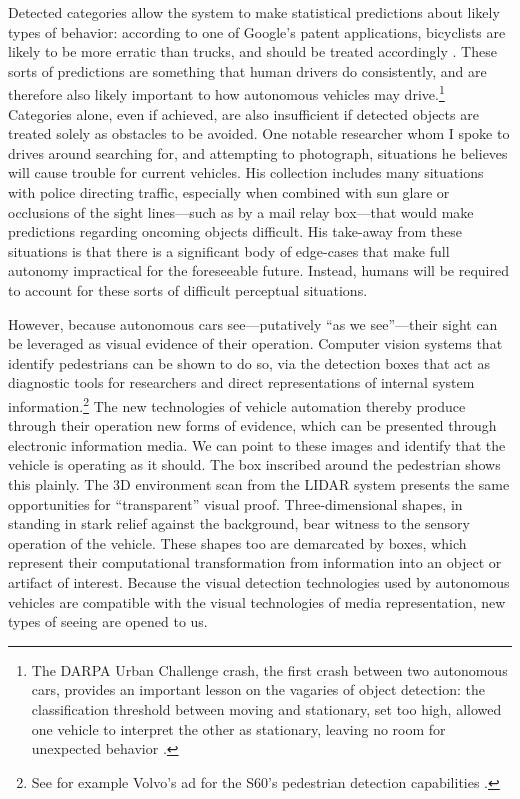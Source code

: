 Detected categories allow the system to make
statistical predictions about likely types of behavior: according to
one of Google's patent applications, bicyclists are likely to be more
erratic than trucks, and should be treated
accordingly \cite{predictPatent}. These sorts of predictions are
something that human drivers do consistently, and are therefore also
likely important to how autonomous vehicles may drive.\footnote{The
  DARPA Urban Challenge crash, the first crash between two autonomous
  cars, provides an important lesson on the vagaries of object
  detection: the classification threshold between moving and
  stationary, set too high, allowed one vehicle to interpret the other
  as stationary, leaving no room for unexpected behavior \cite{collisionPaper}.}
Categories alone, even if achieved, are also insufficient if detected
objects are treated solely as obstacles to be avoided. One notable
researcher whom I spoke to drives around searching 
for, and attempting to photograph, situations he believes will cause
trouble for current vehicles. His collection includes many situations with police
directing traffic, especially when combined with sun glare or
occlusions of the sight lines---such as by a mail relay box---that
would make predictions regarding oncoming 
objects difficult. His take-away from these situations is that there
is a significant body of edge-cases that make full autonomy
impractical for the foreseeable future. Instead, humans will be
required to account for these sorts of difficult perceptual situations. 


However, because autonomous cars see---putatively ``as we see''---their sight can
be leveraged as visual evidence of their operation. Computer vision
systems that identify 
pedestrians can be shown to do so, via the detection boxes that act as
diagnostic tools for researchers and direct representations of
internal system information.\footnote{See for example Volvo's ad for
  the S60's pedestrian detection capabilities \cite{volvovideo}.} The new technologies of vehicle
automation thereby produce through 
their operation new forms of evidence, which can be presented through
electronic information media. We can point to these images and identify
that the vehicle is operating as it should. The box inscribed around
the pedestrian shows this plainly. The 3D environment scan from the
LIDAR system presents the same opportunities for ``transparent'' visual
proof. Three-dimensional shapes, in standing in stark relief against
the background, bear witness to the sensory operation of the vehicle.
These shapes too are demarcated by boxes, which represent their
computational transformation from information into an object or
artifact of interest. Because the visual detection technologies used
by autonomous vehicles are compatible with the visual technologies of
media representation, new types of seeing are opened to us.

